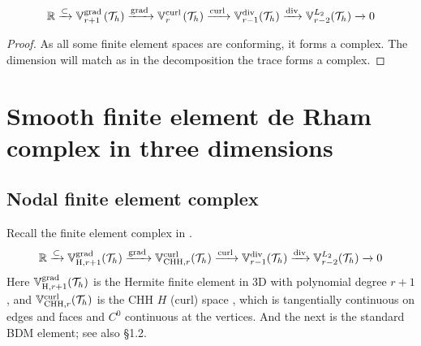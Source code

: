 \documentclass[10pt]{amsart}
\begin{document}
\begin{theorem}
\begin{align*}
\mathbb R\xrightarrow{\subset} \mathbb V^{{\rm grad\,}}_{r+1}(\mathcal T_h)\xrightarrow{{\rm grad\,}}\mathbb V^{{\rm curl\,}}_r(\mathcal T_h) \xrightarrow{{\rm curl\,}} \mathbb V^{\operatorname{div}}_{r-1}(\mathcal T_h) \xrightarrow{\operatorname{div}}\mathbb V^{L_2}_{r-2}(\mathcal T_h)\xrightarrow{}0
\end{align*} 
\end{theorem}
\begin{proof}
As all some finite element spaces are conforming, it forms a complex. The dimension will match as in the decomposition the trace forms a complex. 
\end{proof}

\section{Smooth finite element de Rham complex in three dimensions}
\subsection{Nodal finite element complex}
Recall the finite element complex in \cite[Section 2.3]{ChristiansenHuHu2018}.
\begin{align*}
\mathbb R\xrightarrow{\subset} \mathbb V^{{\rm grad\,}}_{{\rm H},r+1}(\mathcal T_h)\xrightarrow{{\rm grad\,}}\mathbb V^{{\rm curl\,}}_{{\rm CHH}, r}(\mathcal T_h) \xrightarrow{{\rm curl\,}} \mathbb V^{\operatorname{div}}_{r-1}(\mathcal T_h) \xrightarrow{\operatorname{div}}\mathbb V^{L_2}_{r-2}(\mathcal T_h)\xrightarrow{}0
\end{align*} 
Here $\mathbb V^{{\rm grad\,}}_{{\rm H},r+1}(\mathcal T_h)$ is the Hermite finite element in 3D with polynomial degree $r+1$, and $\mathbb V^{{\rm curl\,}}_{{\rm CHH}, r}(\mathcal T_h)$ is the CHH $H$ (curl) space \cite{ChristiansenHuHu2018}, which is tangentially continuous on edges and faces and $C^{0}$ continuous at the vertices. And the next is the standard BDM element; see also \S 1.2. 

\end{document}

